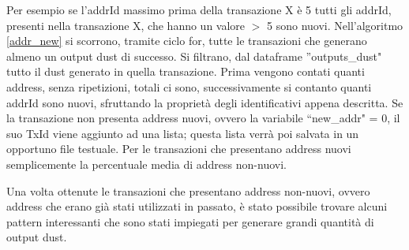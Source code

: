 Per esempio se l'addrId massimo prima della transazione X è 5 tutti gli addrId, presenti nella transazione X, che hanno un valore $>$ 5 sono nuovi. Nell'algoritmo \ref{addr_new} si scorrono, tramite ciclo for, tutte le transazioni che generano almeno un output dust di successo. Si filtrano, dal dataframe ''outputs\_dust" tutto il dust generato in quella transazione. Prima vengono contati quanti address, senza ripetizioni, totali ci sono, successivamente si contanto quanti addrId sono nuovi, sfruttando la proprietà degli identificativi appena descritta. Se la transazione non presenta address nuovi, ovvero la variabile ``new\_addr" = 0, il suo TxId viene aggiunto ad una lista; questa lista verrà poi salvata in un opportuno file testuale. Per le transazioni che presentano address nuovi semplicemente la percentuale media di address non-nuovi.


Una volta ottenute le transazioni che presentano address non-nuovi, ovvero address che erano già stati utilizzati in passato, è stato possibile trovare alcuni pattern interessanti che sono stati impiegati per generare grandi quantità di output dust. 
